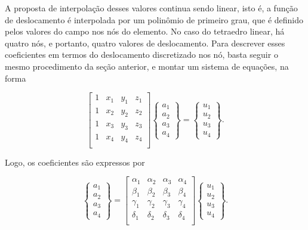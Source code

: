 A proposta de interpolação desses valores continua sendo linear, isto é, a função de deslocamento é interpolada por um polinômio de primeiro grau, que é definido pelos valores do campo nos nós do elemento. No caso do tetraedro linear, há quatro nós, e portanto, quatro valores de deslocamento. Para descrever esses coeficientes em termos do deslocamento discretizado nos nó, basta seguir o mesmo procedimento da seção anterior, e montar um sistema de equações, na forma

\begin{equation}
    \begin{bmatrix}
        1 & x_1 & y_1 & z_1 \\
        1 & x_2 & y_2 & z_2 \\
        1 & x_3 & y_3 & z_3 \\
        1 & x_4 & y_4 & z_4 \\
    \end{bmatrix}
    \begin{Bmatrix}
        a_1 \\ a_2 \\ a_3 \\ a_4
    \end{Bmatrix} = 
    \begin{Bmatrix}
        u_1 \\ u_2 \\ u_3 \\ u_4
    \end{Bmatrix}.
\end{equation}

Logo, os coeficientes são expressos por

\begin{equation}
    \begin{Bmatrix}
        a_1 \\ a_2 \\ a_3 \\ a_4
    \end{Bmatrix} = 
    \begin{bmatrix}
        \alpha_1 & \alpha_2 & \alpha_3 & \alpha_4 \\
        \beta_1 & \beta_2 & \beta_3 & \beta_4 \\
        \gamma_1 & \gamma_2 & \gamma_3 & \gamma_4 \\
        \delta_1 & \delta_2 & \delta_3 & \delta_4 \\
    \end{bmatrix}
    \begin{Bmatrix}
        u_1 \\ u_2 \\ u_3 \\ u_4
    \end{Bmatrix}.
\end{equation}


